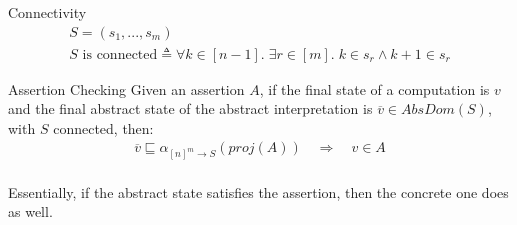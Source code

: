 \documentclass[11pt,svgnames,smaller,aspectratio=43,english]{beamer}
\renewcommand{\implies}{\Rightarrow}
\begin{document}
\begin{frame}{Connectivity}
	\begin{gather*}
		S = (s_1, ..., s_m)\\
		S \text{ is connected} \triangleq \forall k \in [n-1].\; \exists r \in [m].\; k \in s_r \land k+1 \in s_r
	\end{gather*}

	\vspace*{1em}
\end{frame}

\begin{frame}{Assertion Checking}
	Given an assertion $A$, if the final state of a computation is $v$ and the final abstract state of the abstract interpretation is $\overline{v} \in \mathit{AbsDom}(S)$, with $S$ connected, then:\\
	\begin{gather*}
		\overline{v} \sqsubseteq \alpha_{[n]^m \rightarrow S}(proj(A)) \quad\implies\quad v \in A 
	\end{gather*}\\
	\vspace*{1.5em}
	\pause
	Essentially, if the abstract state satisfies the assertion, then the concrete one does as well.
\end{frame}
\end{document}
